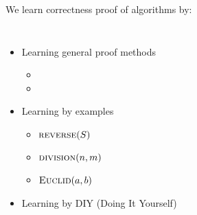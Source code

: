 \begin{frame}{}
  \begin{center}
    {\large We learn correctness proof of algorithms by:}
  \end{center}
  
  \begin{columns}
      \begin{itemize}
        \setlength{\itemsep}{8pt}
        \pause
        \item Learning general proof methods 
          \begin{itemize}
            \setlength{\itemsep}{5pt}
            \item {}
            \item {}
          \end{itemize}
        \pause
        \item Learning by examples
          \begin{itemize}
            \setlength{\itemsep}{5pt}
            \item $\Call{reverse}{S}$
            \item \textcolor{lightgray}{$\Call{division}{n, m}$}
            \item $\Call{Euclid}{a, b}$
          \end{itemize}
        \pause
        \item Learning by DIY {\small (Doing It Yourself)}
      \end{itemize}
  \end{columns}
\end{frame}
